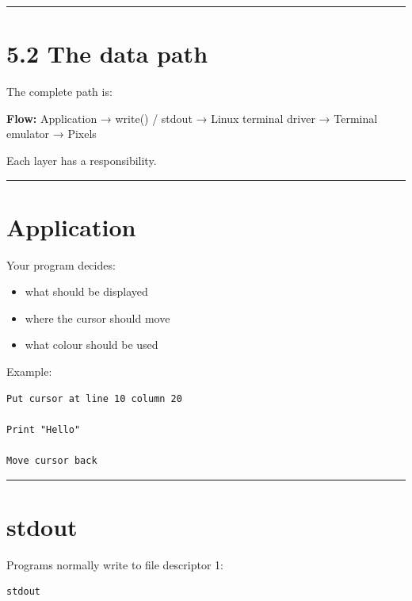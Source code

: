 \documentclass[
  oneside,
  openany]{book}
\providecommand{\tightlist}{%
  \setlength{\itemsep}{0pt}\setlength{\parskip}{0pt}}
\begin{document}
\begin{center}\rule{0.5\linewidth}{0.5pt}\end{center}

\hypertarget{the-data-path}{%
\section{5.2 The data path}\label{the-data-path}}

The complete path is:

\textbf{Flow:} Application → write() / stdout → Linux terminal driver →
Terminal emulator → Pixels

Each layer has a responsibility.

\begin{center}\rule{0.5\linewidth}{0.5pt}\end{center}

\hypertarget{application}{%
\section{Application}\label{application}}

Your program decides:

\begin{itemize}
\tightlist
\item
  what should be displayed
\item
  where the cursor should move
\item
  what colour should be used
\end{itemize}

Example:

\begin{verbatim}
Put cursor at line 10 column 20

Print "Hello"

Move cursor back
\end{verbatim}

\begin{center}\rule{0.5\linewidth}{0.5pt}\end{center}

\hypertarget{stdout}{%
\section{stdout}\label{stdout}}

Programs normally write to file descriptor 1:

\begin{verbatim}
stdout
\end{verbatim}
\end{document}
